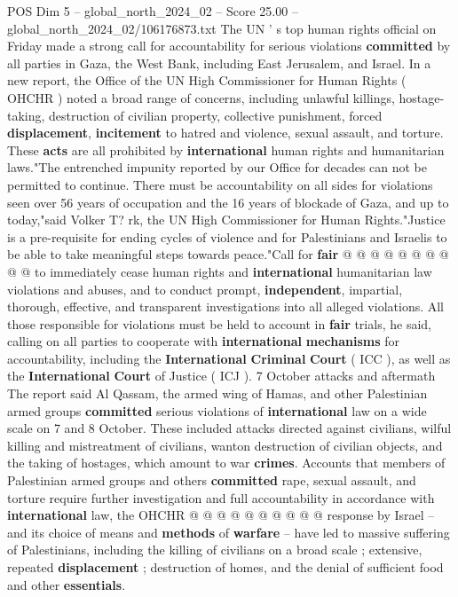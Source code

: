 \begin{textsample}{POS Dim 5 – global\_north\_2024\_02 – Score 25.00 – global\_north\_2024\_02/106176873.txt}  \label{ex:f5_pos_232}
The UN ' s top human rights official on Friday made a strong call for accountability for serious violations \textbf{committed} by all parties in Gaza, the West Bank, including East Jerusalem, and Israel.
In a new report, the Office of the UN High Commissioner for Human Rights ( OHCHR ) noted a broad range of concerns, including unlawful killings, hostage-taking, destruction of civilian property, collective punishment, forced \textbf{displacement}, \textbf{incitement} to hatred and violence, sexual assault, and torture.
These \textbf{acts} are all prohibited by \textbf{international} human rights and humanitarian laws."The entrenched impunity reported by our Office for decades can not be permitted to continue.
There must be accountability on all sides for violations seen over 56 years of occupation and the 16 years of blockade of Gaza, and up to today,"said Volker T? rk, the UN High Commissioner for Human Rights."Justice is a pre-requisite for ending cycles of violence and for Palestinians and Israelis to be able to take meaningful steps towards peace."Call for \textbf{fair} @ @ @ @ @ @ @ @ @ @ to immediately cease human rights and \textbf{international} humanitarian law violations and abuses, and to conduct prompt, \textbf{independent}, impartial, thorough, effective, and transparent investigations into all alleged violations.
All those responsible for violations must be held to account in \textbf{fair} trials, he said, calling on all parties to cooperate with \textbf{international} \textbf{mechanisms} for accountability, including the \textbf{International} \textbf{Criminal} \textbf{Court} ( ICC ), as well as the \textbf{International} \textbf{Court} of Justice ( ICJ ). 7 October attacks and aftermath The report said Al Qassam, the armed wing of Hamas, and other Palestinian armed groups \textbf{committed} serious violations of \textbf{international} law on a wide scale on 7 and 8 October.
These included attacks directed against civilians, wilful killing and mistreatment of civilians, wanton destruction of civilian objects, and the taking of hostages, which amount to war \textbf{crimes}.
Accounts that members of Palestinian armed groups and others \textbf{committed} rape, sexual assault, and torture require further investigation and full accountability in accordance with \textbf{international} law, the OHCHR @ @ @ @ @ @ @ @ @ @ response by Israel -- and its choice of means and \textbf{methods} of \textbf{warfare} -- have led to massive suffering of Palestinians, including the killing of civilians on a broad scale ; extensive, repeated \textbf{displacement} ; destruction of homes, and the denial of sufficient food and other \textbf{essentials}.

\end{textsample}
